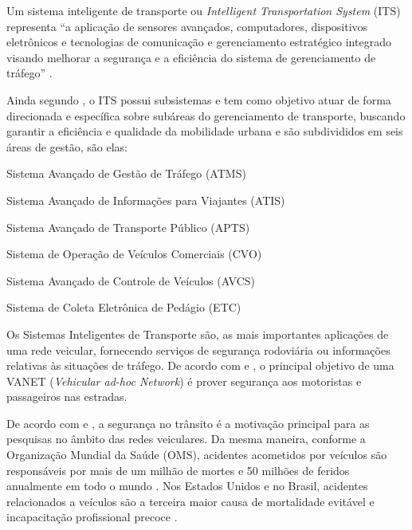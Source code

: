 \documentclass[
	12pt,				%
	oneside,			%
	a4paper,			%
	english,			%
	brazil				%
	]{abntex2ppgsi}
\begin{document}
Um sistema inteligente de transporte ou \textit{Intelligent Transportation System} (ITS) representa ``a aplicação de sensores avançados, computadores, dispositivos eletrônicos e tecnologias de comunicação e gerenciamento estratégico integrado visando melhorar a segurança e a eficiência do sistema de gerenciamento de tráfego'' \cite{nasim2012distributed}. 

Ainda segundo , o ITS possui subsistemas e tem como objetivo atuar de forma direcionada e específica sobre subáreas do gerenciamento de transporte, buscando garantir a eficiência e qualidade da mobilidade urbana e são subdivididos em seis áreas de gestão, são elas: 

\begin{itemize*}
	\item{Sistema Avançado de Gestão de Tráfego (ATMS)}
	\item{Sistema Avançado de Informações para Viajantes (ATIS)}
	\item{Sistema Avançado de Transporte Público (APTS)}
	\item{Sistema de Operação de Veículos Comerciais (CVO)}
	\item{Sistema Avançado de Controle de Veículos (AVCS)}
	\item{Sistema de Coleta Eletrônica de Pedágio (ETC)}
\end{itemize*}

Os Sistemas Inteligentes de Transporte são, as  mais  importantes  aplicações  de  uma  rede  veicular,  fornecendo  serviços  de segurança  rodoviária \cite{xu2003design}  ou  informações  relativas  às  situações  de  tráfego.  De acordo com   e , o principal objetivo de uma  VANET (\textit{Vehicular ad-hoc Network}) é prover segurança aos motoristas e passageiros nas estradas.

De acordo com  e , a segurança no trânsito é a motivação principal para as pesquisas no âmbito das redes veiculares.  Da mesma maneira, conforme a Organização Mundial da Saúde (OMS), acidentes acometidos por veículos são responsáveis por mais de um milhão de mortes e 50 milhões de feridos anualmente em todo o mundo \cite{peden2004world}. Nos Estados Unidos e no Brasil, acidentes relacionados a veículos são  a terceira maior causa de mortalidade evitável e incapacitação profissional precoce \cite{systematics2011crashes} \cite{el2007systematic}. 
\end{document}
